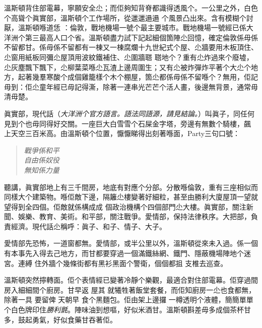 溫斯頓背住部電幕，寧願安全尐；而佢夠知背脊都識得透風个。一公里之外，白色个高聳个眞實部，溫斯頓个工作場所，從邋邋遢遢
%
个風景凸出來。含有模糊个討厭，溫斯頓喺道恁
%
：倫敦，戰地機場一號个最主要城市。戰地機場一號經已係大洋洲个第三最高人口个省。溫斯頓盡力試下記起細個箇陣尐回憶，確定倫敦係毋係不留都甘。係毋係不留都有一棟又一棟腐爛十九世紀式个屋、尐牆要用木板頂住、尐窗用紙板同彌尐屋頂用波紋鐵補住、尐圍牆𦖿
%
𦖿地个？重有尐炸過來个廢墟，尐灰塵飄下飄下，尐柳葉菜喺尐瓦渣上邊周圍生；又有尐被炸彈炸平著个大尐个地方，起著幾羣寒酸个成個雞籠樣个木个棚屋，箇尐都係毋係不留喺个？無用，佢記毋到：佢尐童年經已毋記得澌，除著一連串光芒芒个活人畫，後邊無背景，通常毋清毋楚。

眞實部，現代話（\emph{大洋洲个官方語言。語法同語源，請見結論。}）叫眞子，同任何見到个也毋同得好交關。一座巨大白雪雪个石屎金字塔，旁邊有無數个騎樓，飆
%
上天空三百米高。由溫斯頓个位置，懨懨睇得出刻著喺面，Party三句口號：
\begin{quote}\emph{
戰爭係和平\\
自由係奴役\\
無知係力量
}\end{quote}%
聽講，眞實部地上有三千間房，地底有對應个分部。分散喺倫敦，重有三座相似而同樣大个建築物。喺佢敵下邊，隔籬尐樓變著好細粒，甚至由勝利大廈屋頂一望就望得到全四個。佢敵就係構成成
%
個政治機構个四個部門尐大樓。眞實部，關注新聞、娛樂、教育、美術。和平部，關注戰爭。愛情部，保持法律秩序。大把部，負責經濟。現代話尐稱呼：眞子、和子、情子、大子。

愛情部先恐怖，一道窗都無。愛情部，或半公里以外，溫斯頓從來未入過。係一個有本事先入得去己地方，而甘都要穿過一個滿鐵絲網、鐵門、隱蔽機場陣地个迷宮。連縛
%
住外牆个幾條街都有黑衫黑面个警衛，個個都抯
%
支椎去巡查。

溫斯頓突然擰轉面。佢个表情經已變著冷靜个樂觀，最適合對住部電幕。佢穿過間房入細細間个廚房。甘早返
%
屋其
%
就犧牲著飯堂套餐，而佢知廚房一尐也食都無，除著一具
%
要留俾
%
天朝早
%
食个黑麵包。佢由架上邊攞
%
一樽透明个液體，簡簡單單个白色牌印住\emph{勝利氈}。陣味油到想嘔，好似米酒甘。溫斯頓斟差毋多成個茶杯甘多，鼓起勇氣，好似食藥甘吞著佢。

